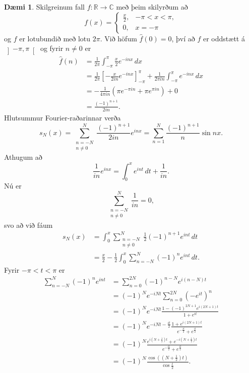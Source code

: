 \documentclass[a4paper,icelandic,11pt]{book}
\theoremstyle{plain}      \newtheorem{setn}{Setning}[chapter]
\theoremstyle{definition} \newtheorem{skilgr}[setn]{Skilgreining}
\newtheorem{daemi}[setn]{Dæmi}
\theoremstyle{remark}     \newtheorem*{ath}{Athugasemd}
\newcommand{\R}{\mathbb R}
\newcommand{\C}{\mathbb C}
\begin{document}
\begin{daemi}
  Skilgreinum fall $f:\R\to\C$ með þeim skilyrðum að
  \[
  f(x) =
  \begin{cases}
    \frac x2, & -\pi<x<\pi,\\
    0, & x = -\pi
  \end{cases}
  \]
  og $f$ er lotubundið með lotu $2\pi$. Við höfum $\hat f(0)=0$, því
  að $f$ er oddstætt á $\left]-\pi,\pi\right[$ og fyrir $n\ne 0$ er
  \begin{align*}
    \hat f(n)
    &= \frac{1}{2\pi}\int_{-\pi}^{\pi}\frac x2 e^{-inx}\,dx
    \\
    &= \frac{1}{2\pi}\left[
      -\frac{x}{2in}e^{-inx}
    \right]_{-\pi}^{\pi}
    + \frac{1}{2\pi in}\int_{-\pi}^{\pi}e^{-inx}\,dx
    \\
    &= -\frac{1}{4\pi in}(\pi e^{-\pi in} + \pi e^{\pi in}) + 0
    \\
    &= \frac{(-1)^{n+1}}{2in}.
  \end{align*}
  Hlutsummur Fourier-raðarinnar verða
  \[
  s_{N}(x)
  = \sum_{\substack{n=-N\\n\ne 0}}^{N} \frac{(-1)^{n+1}}{2in}e^{inx}
  = \sum_{n=1}^{N}\frac{(-1)^{n+1}}{n}\sin{nx}.
  \]
  Athugum að
  \[
  \frac{1}{in}e^{inx}
  = \int_{0}^{x}e^{int}\,dt + \frac{1}{in}.
  \]
  Nú er
  \[
  \sum_{\substack{n=-N\\n\ne 0}}^{N}\frac{1}{in}=0,
  \]
  svo að við fáum
  \begin{align*}
    s_{N}(x)
    &= \int_{0}^{x}\sum_{\substack{n=-N\\n\ne0}}^{N}
    \frac 12 (-1)^{n+1}e^{int}\,dt
    \\
    &= \frac x2 - \frac 12\int_{0}^{x}
    \sum_{n=-N}^{N}(-1)^{n}e^{int}\,dt.
  \end{align*}
  Fyrir $-\pi<t<\pi$ er
  \begin{align*}
    \sum_{n=-N}^{N}(-1)^{n}e^{int}
    &= \sum_{n=0}^{2N}(-1)^{n-N}e^{i(n-N)t}
    \\
    &= (-1)^{N}e^{-iNt}\sum_{n=0}^{2N}(-e^{it})^{n}
    \\
    &= (-1)^{N}e^{-iNt}\frac{1-(-1)^{2N+1}e^{i(2N+1)t}}{1+e^{it}}
    \\
    &= (-1)^{N}e^{-iNt-\frac{it}2}
    \frac{1+e^{i(2N+1)t}}{e^{-\frac{it}2}+e^{\frac{it}2}}
    \\
    &= (-1)^{N}
    \frac{e^{i(N+\frac12)t}+e^{-i(N+\frac12)t}}{e^{-\frac{it}2}+e^{\frac{it}2}}
    \\
    &= (-1)^{N}\frac{\cos((N+\frac12)t)}{\cos{\frac t2}}.
  \end{align*}

\end{daemi}
\end{document}
